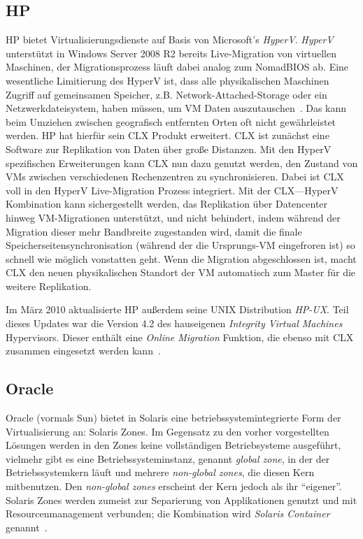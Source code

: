 \subsection{HP}
HP bietet Virtualisierungsdienste auf Basis von Microsoft's
\emph{HyperV}. \emph{HyperV} unterstützt in Windows Server 2008 R2
bereits Live-Migration von virtuellen Maschinen, der Migrationsprozess
läuft dabei analog zum NomadBIOS ab. Eine wesentliche Limitierung des
HyperV ist, dass alle physikalischen Maschinen Zugriff auf gemeinsamen
Speicher, z.B. Network-Attached-Storage oder ein Netzwerkdateisystem,
haben müssen, um \ac{VM} Daten auszutauschen~\cite{hp2010hyperV}. Das kann
beim Umziehen zwischen geografisch entfernten Orten oft nicht
gewährleistet werden. HP hat hierfür sein \ac{CLX} Produkt
erweitert. \ac{CLX} ist zunächst eine Software zur Replikation von Daten
über große Distanzen. Mit den HyperV spezifischen Erweiterungen kann
\ac{CLX} nun dazu genutzt werden, den Zustand von \acp{VM} zwischen
verschiedenen Rechenzentren zu synchronisieren. Dabei ist \ac{CLX} voll in
den HyperV Live-Migration Prozess integriert. Mit der \ac{CLX}---HyperV
Kombination kann sichergestellt werden, das Replikation über
Datencenter hinweg \ac{VM}-Migrationen unterstützt, und nicht behindert,
indem während der Migration dieser mehr Bandbreite zugestanden wird,
damit die finale Speicherseitensynchronisation (während der die
Ursprungs-\ac{VM} eingefroren ist) so schnell wie möglich vonstatten
geht. Wenn die Migration abgeschlossen ist, macht \ac{CLX} den neuen
physikalischen Standort der \ac{VM} automatisch zum Master für die weitere
Replikation.

Im März 2010 aktualisierte HP außerdem seine UNIX Distribution
\emph{HP-UX}. Teil dieses Updates war die Version 4.2 des hauseigenen
\emph{Integrity Virtual Machines} Hypervisors. Dieser enthält eine
\emph{Online Migration} Funktion, die ebenso mit \ac{CLX} zusammen
eingesetzt werden kann~\cite{hp2010integrity}.

\subsection{Oracle}

Oracle (vormals Sun) bietet in Solaris eine betriebssystemintegrierte
Form der Virtualisierung an: Solaris Zones. Im Gegensatz zu den vorher
vorgestellten Lösungen werden in den Zones keine vollständigen
Betriebsysteme ausgeführt, vielmehr gibt es eine
Betriebssysteminstanz, genannt \emph{global zone}, in der der
Betriebssystemkern läuft und mehrere \emph{non-global zones}, die
diesen Kern mitbenutzen. Den \emph{non-global zones} erscheint der
Kern jedoch als ihr "`eigener"'. Solaris Zones werden zumeist zur
Separierung von Applikationen genutzt und mit Resourcenmanagement
verbunden; die Kombination wird \emph{Solaris Container}
genannt~\cite{price2004solaris}.

